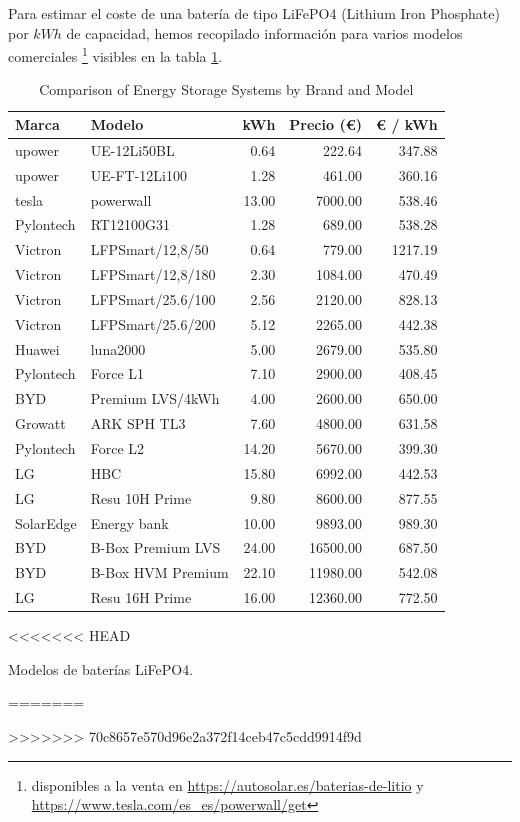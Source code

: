 Para estimar el coste de una batería de tipo LiFePO4 (Lithium Iron Phosphate)
por $kWh$ de capacidad, hemos recopilado información para varios modelos
comerciales \footnote{disponibles a la venta en
	\url{https://autosolar.es/baterias-de-litio} y
	\url{https://www.tesla.com/es_es/powerwall/get}} visibles en la tabla
\ref{tab:batteries_data}.

\begin{table}[htbp]
	\centering
	\begin{tabular}{llrrr}
		\toprule
		Marca     & Modelo            & kWh   & Precio (€) & € / kWh \\
		\midrule
		upower    & UE-12Li50BL       & 0.64  & 222.64     & 347.88  \\
		upower    & UE-FT-12Li100     & 1.28  & 461.00     & 360.16  \\
		tesla     & powerwall         & 13.00 & 7000.00    & 538.46  \\
		Pylontech & RT12100G31        & 1.28  & 689.00     & 538.28  \\
		Victron   & LFPSmart/12,8/50  & 0.64  & 779.00     & 1217.19 \\
		Victron   & LFPSmart/12,8/180 & 2.30  & 1084.00    & 470.49  \\
		Victron   & LFPSmart/25.6/100 & 2.56  & 2120.00    & 828.13  \\
		Victron   & LFPSmart/25.6/200 & 5.12  & 2265.00    & 442.38  \\
		Huawei    & luna2000          & 5.00  & 2679.00    & 535.80  \\
		Pylontech & Force L1          & 7.10  & 2900.00    & 408.45  \\
		BYD       & Premium LVS/4kWh  & 4.00  & 2600.00    & 650.00  \\
		Growatt   & ARK SPH TL3       & 7.60  & 4800.00    & 631.58  \\
		Pylontech & Force L2          & 14.20 & 5670.00    & 399.30  \\
		LG        & HBC               & 15.80 & 6992.00    & 442.53  \\
		LG        & Resu 10H Prime    & 9.80  & 8600.00    & 877.55  \\
		SolarEdge & Energy bank       & 10.00 & 9893.00    & 989.30  \\
		BYD       & B-Box Premium LVS & 24.00 & 16500.00   & 687.50  \\
		BYD       & B-Box HVM Premium & 22.10 & 11980.00   & 542.08  \\
		LG        & Resu 16H Prime    & 16.00 & 12360.00   & 772.50  \\
		\bottomrule
	\end{tabular}
<<<<<<< HEAD
	\caption{Modelos de baterías LiFePO4.}
=======
	\caption{Comparison of Energy Storage Systems by Brand and Model}
>>>>>>> 70c8657e570d96e2a372f14ceb47c5cdd9914f9d
	\label{tab:batteries_data}
\end{table}

